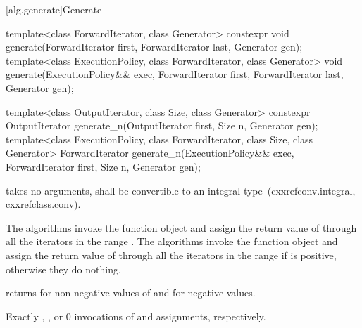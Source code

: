 [alg.generate]{Generate}

%
%
\begin{itemdecl}
template<class ForwardIterator, class Generator>
  constexpr void generate(ForwardIterator first, ForwardIterator last,
                          Generator gen);
template<class ExecutionPolicy, class ForwardIterator, class Generator>
  void generate(ExecutionPolicy&& exec,
                ForwardIterator first, ForwardIterator last,
                Generator gen);

template<class OutputIterator, class Size, class Generator>
  constexpr OutputIterator generate_n(OutputIterator first, Size n, Generator gen);
template<class ExecutionPolicy, class ForwardIterator, class Size, class Generator>
  ForwardIterator generate_n(ExecutionPolicy&& exec,
                             ForwardIterator first, Size n, Generator gen);
\end{itemdecl}

\begin{itemdescr}
\pnum
\requires
{} takes no arguments,
shall be convertible to an integral type~(cxxref{conv.integral}, cxxref{class.conv}).

\pnum
\effects
The  algorithms invoke the function object  and assign the return
value of  through all the iterators in the range
. The  algorithms invoke the function object
 and assign the return value of  through all the iterators in
the range  if  is positive,
otherwise they do nothing.

\pnum
\returns {} returns  for non-negative values of 
and  for negative values.

\pnum
\complexity
Exactly
,
, or 0
invocations of  and assignments, respectively.
\end{itemdescr}


